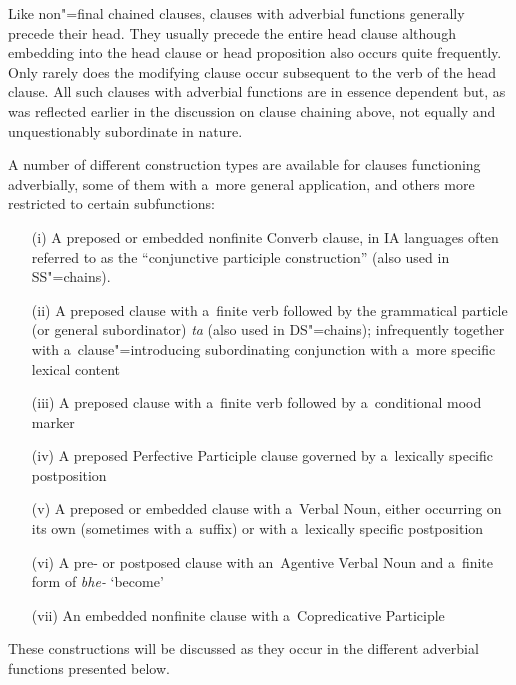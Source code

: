 Like non"=final chained clauses, clauses with adverbial functions generally precede their head. They usually precede the entire head clause although embedding into the head clause or head proposition also occurs quite frequently. Only rarely does the modifying clause occur subsequent to the verb of the head clause. All such clauses with adverbial functions are in essence dependent but, as was reflected earlier in the discussion on clause chaining above, not equally and unquestionably subordinate in nature. 



A number of different construction types are available for clauses functioning adverbially, some of them with a~more general application, and others more restricted to certain subfunctions:


\begin{enumerate}
\item[(i)] A preposed or embedded nonfinite Converb clause, in IA languages often referred to as the ``conjunctive participle construction'' (also used in SS"=chains).

\item[(ii)] A preposed clause with a~finite verb followed by the grammatical particle (or general subordinator) \textit{ta} (also used in DS"=chains); infrequently together with a~clause"=introducing subordinating conjunction with a~more specific lexical content

\item[(iii)] A preposed clause with a~finite verb followed by a~conditional mood marker

\item[(iv)] A preposed Perfective Participle clause governed by a~lexically specific postposition

\item[(v)] A preposed or embedded clause with a~Verbal Noun, either occurring on its own (sometimes with a~suffix) or with a~lexically specific postposition

\item[(vi)] A pre- or postposed clause with an~Agentive Verbal Noun and a~finite form of \textit{bhe-} `become'

\item[(vii)] An embedded nonfinite clause with a~Copredicative Participle
\end{enumerate}

These constructions will be discussed as they occur in the different adverbial functions presented below. 


